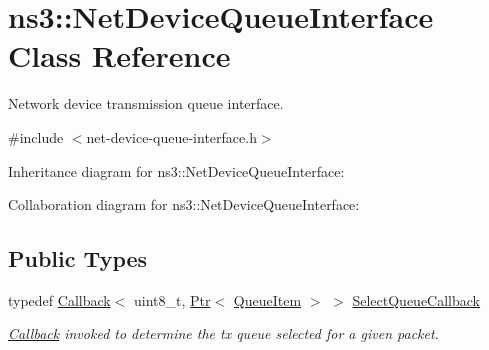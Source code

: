 \hypertarget{classns3_1_1NetDeviceQueueInterface}{}\section{ns3\+:\+:Net\+Device\+Queue\+Interface Class Reference}
\label{classns3_1_1NetDeviceQueueInterface}


Network device transmission queue interface.  




{\ttfamily \#include $<$net-\/device-\/queue-\/interface.\+h$>$}



Inheritance diagram for ns3\+:\+:Net\+Device\+Queue\+Interface\+:


Collaboration diagram for ns3\+:\+:Net\+Device\+Queue\+Interface\+:
\subsection*{Public Types}
\begin{DoxyCompactItemize}
\item 
typedef \hyperlink{classns3_1_1Callback}{Callback}$<$ uint8\+\_\+t, \hyperlink{classns3_1_1Ptr}{Ptr}$<$ \hyperlink{classns3_1_1QueueItem}{Queue\+Item} $>$ $>$ \hyperlink{classns3_1_1NetDeviceQueueInterface_aaac934ccd4f0cf5517b2b0a0f4ab7a5a}{Select\+Queue\+Callback}
\begin{DoxyCompactList}\small\item\em \hyperlink{classns3_1_1Callback}{Callback} invoked to determine the tx queue selected for a given packet. \end{DoxyCompactList}\end{DoxyCompactItemize}

